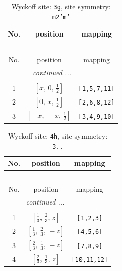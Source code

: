 \documentclass[fleqn,8pt]{jsarticle}
\begin{document}
\begin{longtable}{ccc}
\caption{Wyckoff site: {\tt 3g}, site symmetry: {\tt m2'm'}}
 \\
 \hline \hline
No. & position & mapping \\ \hline \endfirsthead

\multicolumn{2}{l}{\tablename\ \thetable{}} \\
 \hline \hline
No. & position & mapping \\ \hline \endhead

 \hline \hline
\multicolumn{2}{r}{\footnotesize\it continued ...} \\ \endfoot

 \hline \hline
\multicolumn{2}{r}{} \\ \endlastfoot

1 & $\left[ x,\, 0,\, \frac{1}{2} \right]$ & {\tt [1,5,7,11]} \\ \hline
2 & $\left[ 0,\, x,\, \frac{1}{2} \right]$ & {\tt [2,6,8,12]} \\ \hline
3 & $\left[ - x,\, - x,\, \frac{1}{2} \right]$ & {\tt [3,4,9,10]} \\
\end{longtable}
\renewcommand{\arraystretch}{1.2}
\begin{longtable}{ccc}
\caption{Wyckoff site: {\tt 4h}, site symmetry: {\tt 3..}}
 \\
 \hline \hline
No. & position & mapping \\ \hline \endfirsthead

\multicolumn{2}{l}{\tablename\ \thetable{}} \\
 \hline \hline
No. & position & mapping \\ \hline \endhead

 \hline \hline
\multicolumn{2}{r}{\footnotesize\it continued ...} \\ \endfoot

 \hline \hline
\multicolumn{2}{r}{} \\ \endlastfoot

1 & $\left[ \frac{1}{3},\, \frac{2}{3},\, z \right]$ & {\tt [1,2,3]} \\ \hline
2 & $\left[ \frac{1}{3},\, \frac{2}{3},\, - z \right]$ & {\tt [4,5,6]} \\ \hline
3 & $\left[ \frac{2}{3},\, \frac{1}{3},\, - z \right]$ & {\tt [7,8,9]} \\ \hline
4 & $\left[ \frac{2}{3},\, \frac{1}{3},\, z \right]$ & {\tt [10,11,12]} \\
\end{longtable}
\end{document}
